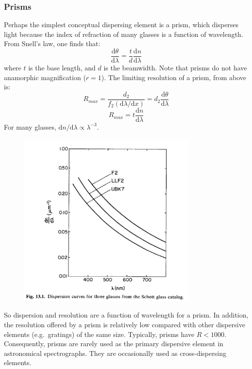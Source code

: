 \documentclass[12pt]{article}
\begin{document}
\subsubsection{Prisms}
Perhaps the simplest conceptual dispersing element is a prism, which
disperses light because the index of refraction of many glasses is a
function of wavelength. From Snell's law, one finds that:
\[
    \frac{\mathrm{d}\theta}{\mathrm{d}\lambda}
    = \frac{t}{d}\frac{\mathrm{d}n}{\mathrm{d}\lambda}
    \]
where $t$ is the base length, and $d$ is the beamwidth. Note that prisms
do not have anamorphic magnification ($r=1$). The limiting resolution
of a prism, from above is:
\[
    R_{max} = \frac{d_{2}}{f_{2}(\mathrm{d}\lambda/\mathrm{d}x)} =
    d_{2}\frac{\mathrm{d}\theta}{\mathrm{d}\lambda}
    \]
\[
    R_{max} = t\frac{\mathrm{d}n}{\mathrm{d}\lambda}
    \]
For many glasses, $\mathrm{d}n/\mathrm{d}\lambda \propto \lambda^{-3}$.
\begin{figure}
    \centering
    \includegraphics[width=0.8\textwidth]{curves.png}
\end{figure}
So dispersion and resolution are a function of wavelength for a prism.
In addition, the resolution offered by a prism is relatively low
compared with other dispersive elements (e.g.\ gratings) of the same
size. Typically, prisms have $R < 1000$. Consequently, prisms are rarely
used as the primary dispersive element in astronomical spectrographs.
They are occasionally used as cross-dispersing elements.
\end{document}
